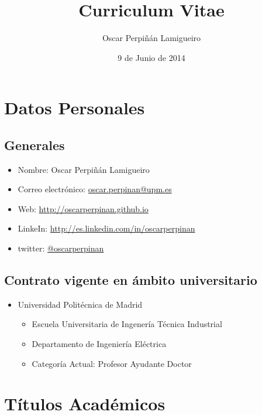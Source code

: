 \documentclass[article, a4paper]{memoir}
\author{Oscar Perpiñán Lamigueiro}
\date{9 de Junio de 2014}
\title{Curriculum Vitae}
\begin{document}
\maketitle


\section{Datos Personales}
\label{sec-1}

\subsection{Generales}
\label{sec-1-1}

\begin{itemize}
\item Nombre: Oscar Perpiñán Lamigueiro
\item Correo electrónico: \href{mailto:oscar.perpinan@upm.es}{oscar.perpinan@upm.es}
\item Web: \url{http://oscarperpinan.github.io}
\item LinkeIn: \url{http://es.linkedin.com/in/oscarperpinan}
\item twitter: \href{https://twitter.com/oscarperpinan}{@oscarperpinan}
\end{itemize}


\subsection{Contrato vigente en ámbito universitario}
\label{sec-1-2}

\begin{itemize}
\item Universidad Politécnica de Madrid
\begin{itemize}
\item Escuela Universitaria de Ingenería Técnica Industrial
\item Departamento de Ingeniería Eléctrica
\item Categoría Actual: Profesor Ayudante Doctor
\end{itemize}
\end{itemize}


\section{Títulos Académicos}
\label{sec-2}
\end{document}

